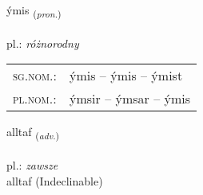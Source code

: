 \documentclass[frontgrid, backgrid]{flacards}\usepackage[]{graphicx}\usepackage[]{xcolor}
\begin{document}
\renewcommand{\blhead}{\vskip5pt {\small\bfseries\footnotesize Fornafn | zaimek }}
\renewcommand{\bcfoot}{\vskip5pt \hspace{2pt}{\small\bfseries\footnotesize 1K}}


{ýmis \small{\textsubscript{(\textit{pron.})}} \\[1ex] %
\textphonetic{[iːmɪs]} \\
pl.: \emph{różnorodny} \\  [2ex]
\renewcommand*{\arraystretch}{0.8}
\begin{tabular}{ll}
\textsc{sg.nom.}: & ýmis  --  ýmis -- ýmist \\ 
\textsc{pl.nom.}: & ýmsir -- ýmsar -- ýmis
\end{tabular}
}


\renewcommand{\flhead}{\vskip5pt \fboxsep=0pt {\small\bfseries\footnotesize Atviksorð | przysłówek}}
\renewcommand{\fcfoot}{\vskip5pt \fboxsep=0pt \hspace{2pt}{\small\bfseries\footnotesize 1K}}

\renewcommand{\blhead}{\vskip5pt {\small\bfseries\footnotesize Atviksorð | przysłówek }}
\renewcommand{\bcfoot}{\vskip5pt \hspace{2pt}{\small\bfseries\footnotesize 1K}}


{alltaf \small{\textsubscript{(\textit{adv.})}} \\[1ex]
\textphonetic{[al̥taf]} \\
pl.: \emph{zawsze} \\  [2ex]
alltaf (Indeclinable)}


\renewcommand{\flhead}{\vskip5pt \fboxsep=0pt {\small\bfseries\footnotesize Atviksorð | przysłówek}}
\renewcommand{\fcfoot}{\vskip5pt \fboxsep=0pt \hspace{2pt}{\small\bfseries\footnotesize 1K}}

\renewcommand{\blhead}{\vskip5pt {\small\bfseries\footnotesize Atviksorð | przysłówek }}
\renewcommand{\bcfoot}{\vskip5pt \hspace{2pt}{\small\bfseries\footnotesize 1K}}
\end{document}
